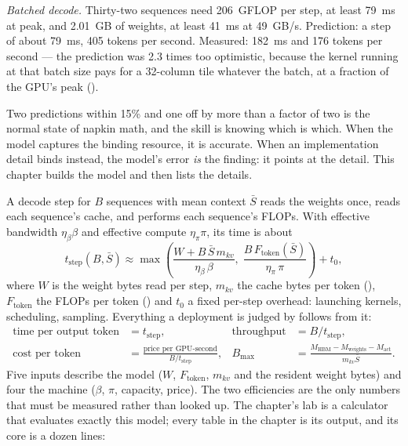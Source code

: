 \emph{Batched decode.} Thirty-two sequences need 206~GFLOP per step, at least
79~ms at peak, and 2.01~GB of weights, at least 41~ms at 49~GB/s. Prediction: a
step of about 79~ms, 405 tokens per second. Measured: 182~ms and 176 tokens per
second --- the prediction was 2.3 times too optimistic, because the kernel
running at that batch size pays for a 32-column tile whatever the batch, at a
fraction of the GPU's peak ().

Two predictions within 15\% and one off by more than a factor of two is the
normal state of napkin math, and the skill is knowing which is which. When the
model captures the binding resource, it is accurate. When an implementation
detail binds instead, the model's error \emph{is} the finding: it points at the
detail. This chapter builds the model and then lists the details.



A decode step for $B$ sequences with mean context $\bar{S}$ reads the weights
once, reads each sequence's cache, and performs each sequence's FLOPs. With
effective bandwidth $\eta_\beta\beta$ and effective compute $\eta_\pi\pi$, its
time is about
\begin{equation}
t_{\text{step}}(B,\bar{S}) \approx
\max\!\left(\frac{W + B\,\bar{S}\,m_{kv}}{\eta_\beta\,\beta},\;
\frac{B\,F_{\text{token}}(\bar{S})}{\eta_\pi\,\pi}\right) + t_0,
\label{eq:step-time}
\end{equation}
where $W$ is the weight bytes read per step, $m_{kv}$ the cache bytes per
token (), $F_{\text{token}}$ the FLOPs per token
() and $t_0$ a fixed per-step overhead: launching kernels,
scheduling, sampling. Everything a deployment is judged by follows from it:
\begin{align}
\text{time per output token} &= t_{\text{step}}, &
\text{throughput} &= B/t_{\text{step}}, \label{eq:throughput}\\
\text{cost per token} &= \frac{\text{price per GPU-second}}{B/t_{\text{step}}}, &
B_{\max} &= \frac{M_{\text{HBM}}-M_{\text{weights}}-M_{\text{act}}}{m_{kv}\bar{S}}.\nonumber
\end{align}
Five inputs describe the model ($W$, $F_{\text{token}}$, $m_{kv}$ and the
resident weight bytes) and four the machine ($\beta$, $\pi$, capacity, price).
The two efficiencies are the only numbers that must be measured rather than
looked up. The chapter's lab is a calculator that evaluates exactly this
model; every table in the chapter is its output, and its core is a dozen lines:


